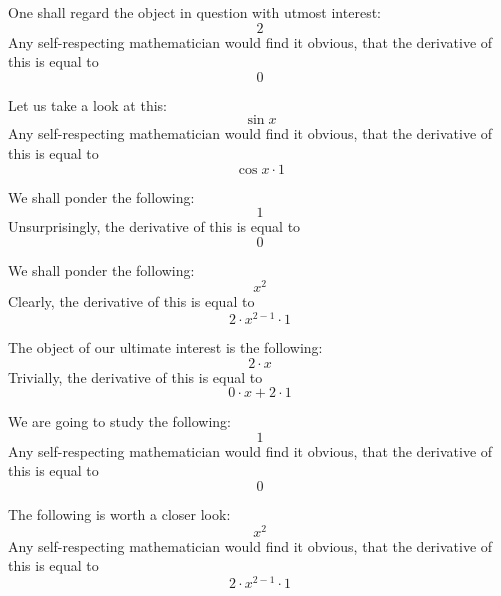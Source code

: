 \documentclass{article}
\begin{document}
One shall regard the object in question with utmost interest:
\begin{equation}
2 
\end{equation}
Any self-respecting mathematician would find it obvious, that the derivative of this is equal to
\begin{equation}
0 
\end{equation}

Let us take a look at this:
\begin{equation}
\sin x 
\end{equation}
Any self-respecting mathematician would find it obvious, that the derivative of this is equal to
\begin{equation}
\cos x \cdot 1 
\end{equation}

We shall ponder the following:
\begin{equation}
1 
\end{equation}
Unsurprisingly, the derivative of this is equal to
\begin{equation}
0 
\end{equation}

We shall ponder the following:
\begin{equation}
x ^{2 } 
\end{equation}
Clearly, the derivative of this is equal to
\begin{equation}
2 \cdot x ^{2 - 1 } \cdot 1 
\end{equation}

The object of our ultimate interest is the following:
\begin{equation}
2 \cdot x 
\end{equation}
Trivially, the derivative of this is equal to
\begin{equation}
0 \cdot x + 2 \cdot 1 
\end{equation}

We are going to study the following:
\begin{equation}
1 
\end{equation}
Any self-respecting mathematician would find it obvious, that the derivative of this is equal to
\begin{equation}
0 
\end{equation}

The following is worth a closer look:
\begin{equation}
x ^{2 } 
\end{equation}
Any self-respecting mathematician would find it obvious, that the derivative of this is equal to
\begin{equation}
2 \cdot x ^{2 - 1 } \cdot 1 
\end{equation}
\end{document}
